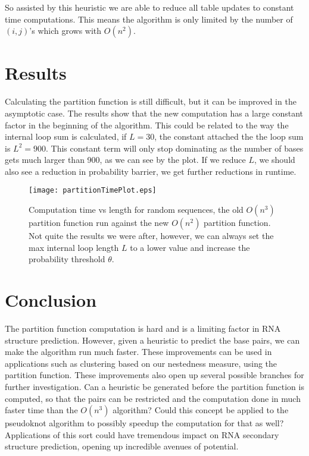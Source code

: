 So assisted by this heuristic we are able to reduce all table updates
to constant time computations. This means the algorithm is only
limited by the number of $(i,j)$'s which grows with $O(n^2)$. 

\section{Results}

Calculating the partition function is still difficult, but it can be
improved in the asymptotic case. The results show that the new
computation has a large constant factor in the beginning of the
algorithm. This could be related to the way the internal loop sum is
calculated, if $L=30$, the constant attached the the loop sum is
$L^2=900$. This constant term will only stop dominating as the number
of bases gets much larger than 900, as we can see by the plot. If we
reduce $L$, we should also see a reduction in  probability barrier, we
get further reductions in runtime.

\begin{figure}
\centering
\texttt{[image: partitionTimePlot.eps]} 
\caption[Partition Function Speedups]{Computation time vs length for random sequences, the old
  $O(n^3)$ partition function run against the new $O(n^2)$ partition
  function. Not quite the results we were after, however, we can
  always set the max internal loop length $L$ to a lower value and
  increase the probability threshold $\theta$.}
\label{fig:pfResults}
\end{figure}




\section{Conclusion}

The partition function computation is hard and is a limiting factor in
RNA structure prediction. However, given a heuristic to predict the
base pairs, we can make the algorithm run much faster. These
improvements can be used in applications such as clustering based on
our nestedness measure, using the partition function. These
improvements also open up several possible branches for further
investigation. Can a heuristic be generated before the partition
function is computed, so that the pairs can be restricted and the
computation done in much faster time than the $O(n^3)$ algorithm?
Could this concept be applied to the pseudoknot algorithm to possibly
speedup the computation for that as well? Applications of this sort
could have tremendous impact on RNA secondary structure prediction,
opening up incredible avenues of potential.

